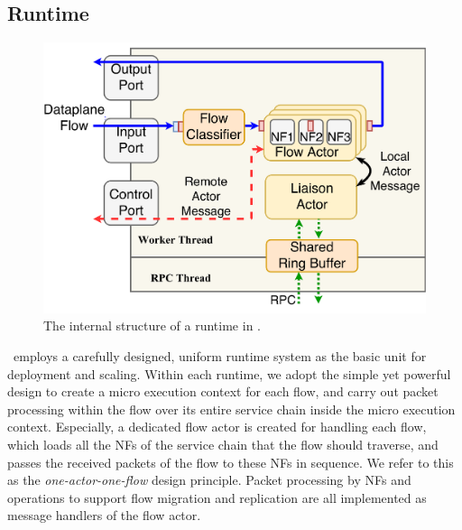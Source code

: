
\subsection{Runtime}
\label{sec:runtime}

\begin{figure}
		\centering
		\includegraphics[width=\columnwidth]{figure/new-nfactor-runtime-arch.pdf}

		\caption{The internal structure of a runtime in \nfactor.}
\label{fig:runtime-arch}
\end{figure}

\nfactor~employs a carefully designed, uniform runtime system as the basic unit for deployment and scaling. %
  Within each runtime, we adopt the simple yet powerful design to create a micro execution context for each flow, and carry out %
  packet processing within the flow over its entire service chain inside the micro execution context. Especially, a dedicated flow actor is created for handling each flow, which loads all the NFs of the service chain that the flow should traverse, and passes the received packets of the flow to these NFs in sequence. We refer to this as the {\em one-actor-one-flow} design principle. Packet processing by NFs and operations to support flow migration and replication are all implemented as message handlers of the flow actor.


